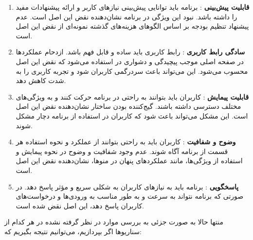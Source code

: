 \begin{enumerate}
	\item \textbf{قابلیت پیش‌بینی }: برنامه باید توانایی پیش‌بینی نیازهای کاربر و ارائه پیشنهادات مفید را داشته باشد. نبود این ویژگی در برنامه نشان‌دهنده نقض این اصل است. عدم پیشنهاد تنظیم بودجه بر اساس الگوهای هزینه‌های گذشته نمونه‌ای از نقض این اصل است.
	
	\item \textbf{سادگی رابط کاربری }: رابط کاربری باید ساده و قابل فهم باشد. ازدحام عملکردها در صفحه اصلی موجب پیچیدگی و دشواری در استفاده می‌شود که نقض این اصل محسوب می‌شود. این می‌تواند باعث سردرگمی کاربران شود و تجربه کاربری را به شدت کاهش دهد.
	
	\item \textbf{قابلیت پیمایش }: کاربران باید بتوانند به راحتی در برنامه حرکت کنند و به ویژگی‌های مختلف دسترسی داشته باشند. گیج‌کننده بودن ساختار  نشان‌دهنده نقض این اصل است. این مشکل می‌تواند باعث شود که کاربران در استفاده از برنامه دچار مشکل شوند.
	
	\item \textbf{وضوح و شفافیت }: کاربران باید به راحتی بتوانند از عملکرد و نحوه استفاده هر قسمت از برنامه آگاه شوند. عدم وجود شفافیت و وضوح در نحوه پیمایش و استفاده از ویژگی‌ها، مانند عملکردهای پنهان در منوها، نشان‌دهنده نقض این اصل است.
	
	\item \textbf{پاسخگویی }: برنامه باید به نیازهای کاربران به شکلی سریع و مؤثر پاسخ دهد. در صورتی که برنامه نتواند به سرعت و به طور مناسب به ورودی‌ها و درخواست‌های کاربران پاسخ دهد، این اصل نقض شده است.
\end{enumerate}

منتها حالا به صورت جزئی به بررسی موارد در نظر گرفته نشده در هر کدام از سناریوها اگر بپردازیم، می‌توانیم نتیجه بگیریم که:

